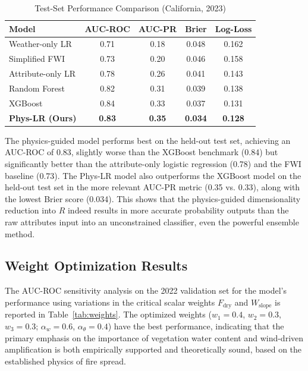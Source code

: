 \documentclass[conference]{IEEEtran}
\begin{document}
\begin{table}[h]
\caption{Test-Set Performance Comparison (California, 2023)}
\label{tab:results}
\centering
\small
\begin{tabular}{|l|c|c|c|c|}
\hline
\textbf{Model} & \textbf{AUC-ROC} & \textbf{AUC-PR} & \textbf{Brier} & \textbf{Log-Loss} \\
\hline
Weather-only LR    & 0.71 & 0.18 & 0.048 & 0.162 \\
Simplified FWI     & 0.73 & 0.20 & 0.046 & 0.158 \\
Attribute-only LR  & 0.78 & 0.26 & 0.041 & 0.143 \\
Random Forest      & 0.82 & 0.31 & 0.039 & 0.138 \\
XGBoost            & 0.84 & 0.33 & 0.037 & 0.131 \\
\textbf{Phys-LR (Ours)} & \textbf{0.83} & \textbf{0.35} & \textbf{0.034} & \textbf{0.128} \\
\hline
\end{tabular}
\end{table}

The physics-guided model performs best on the held-out test set, achieving an AUC-ROC of 0.83, slightly worse than the XGBoost benchmark (0.84) but significantly better than the attribute-only logistic regression (0.78) and the FWI baseline (0.73). The Phys-LR model also outperforms the XGBoost model on the held-out test set in the more relevant AUC-PR metric (0.35 vs. 0.33), along with the lowest Brier score (0.034). This shows that the physics-guided dimensionality reduction into $R$ indeed results in more accurate probability outputs than the raw attributes input into an unconstrained classifier, even the powerful ensemble method.

\subsection{Weight Optimization Results}

The AUC-ROC sensitivity analysis on the 2022 validation set for the model's performance using variations in the critical scalar weights $F_{\mathrm{dry}}$ and $W_{\mathrm{slope}}$ is reported in Table~\ref{tab:weights}. The optimized weights ($w_1 = 0.4$, $w_2 = 0.3$, $w_3 = 0.3$; $\alpha_w = 0.6$, $\alpha_\theta = 0.4$) have the best performance, indicating that the primary emphasis on the importance of vegetation water content and wind-driven amplification is both empirically supported and theoretically sound, based on the established physics of fire spread.
\end{document}
